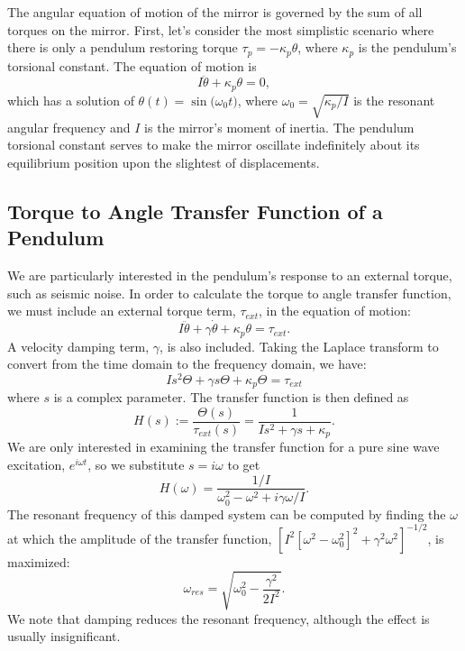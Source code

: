 The angular equation of motion of the mirror is governed by the sum of
all torques on the mirror. First, let's consider the most simplistic
scenario where there is only a pendulum restoring torque
$\tau_p=-\kappa_p \theta$, where $\kappa_p$ is the pendulum's
torsional constant. The equation of motion is
\begin{equation}
I \ddot{\theta} + \kappa_p \theta = 0,
\end{equation}
which has a solution of $\theta(t) = \sin({\omega_0 t)}$, where
$\omega_0 = \sqrt{\kappa_p/I}$ is the resonant angular frequency and
$I$ is the mirror's moment of inertia. The pendulum torsional constant
serves to make the mirror oscillate indefinitely about its equilibrium
position upon the slightest of displacements.


\subsection{Torque to Angle Transfer Function of a Pendulum}
\label{sec:t2a}
We are particularly interested in the pendulum's response to an
external torque, such as seismic noise. In order to calculate the
torque to angle transfer function, we must include an external torque
term, $\tau_{ext}$, in the equation of motion:
\begin{equation}
I \ddot{\theta} + \gamma \dot{\theta} + \kappa_p \theta = \tau_{ext}.
\label{eq:eqmotion}
\end{equation}
A velocity damping term, $\gamma$, is also included. Taking the Laplace transform to convert from the time domain to the frequency domain, we have:
\begin{equation}
I s^2 \Theta + \gamma s \Theta + \kappa_p \Theta = \tau_{ext}
\end{equation}
where $s$ is a complex parameter. The transfer function is then
defined as
\begin{equation}
H(s) := \frac{\Theta(s)}{\tau_{ext}(s)} = \frac{1}{I s^2 + \gamma s + \kappa_p}.
\label{eq:TF}
\end{equation}
We are only interested in examining the transfer function for a pure
sine wave excitation, $e^{i\omega t}$, so we substitute $s=i\omega$ to
get
\begin{equation}
H(\omega) = \frac{1/I}{\omega_0^2  - \omega^2 + i \gamma \omega / I}.
\end{equation}
The resonant frequency of this damped system can be computed by finding the
$\omega$ at which the amplitude of the transfer function, $[I^2
[\omega^2 - \omega_0^2]^2 + \gamma^2 \omega^2]^{-1/2}$, is maximized:
\begin{equation}
\omega_{res} = \sqrt{\omega_0^2 - \frac{\gamma^2}{2I^2}}.
\end{equation}
We note that damping reduces the resonant frequency, although the effect is usually insignificant.

